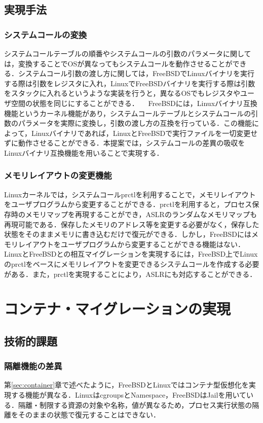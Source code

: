 \documentclass[11pt]{jarticle}
\begin{document}
\subsection{実現手法}
\subsubsection{システムコールの変換}
システムコールテーブルの順番やシステムコールの引数のパラメータに関しては，変換することでOSが異なってもシステムコールを動作させることができる．システムコール引数の渡し方に関しては，FreeBSDでLinuxバイナリを実行する際は引数をレジスタに入れ，LinuxでFreeBSDバイナリを実行する際は引数をスタックに入れるというような実装を行うと，異なるOSでもレジスタやユーザ空間の状態を同じにすることができる．
　FreeBSDには，Linuxバイナリ互換機能\cite{linux-emu}というカーネル機能があり，システムコールテーブルとシステムコールの引数のパラメータを実際に変換し，引数の渡し方の互換を行っている．この機能によって，Linuxバイナリであれば，LinuxとFreeBSDで実行ファイルを一切変更せずに動作させることができる．本提案では，システムコールの差異の吸収をLinuxバイナリ互換機能を用いることで実現する．

\subsubsection{メモリレイアウトの変更機能}
Linuxカーネルでは，システムコールprctlを利用することで，メモリレイアウトをユーザプログラムから変更することができる．prctlを利用すると，プロセス保存時のメモリマップを再現することができ，ASLRのランダムなメモリマップも再現可能である．保存したメモリのアドレス等を変更する必要がなく，保存した状態をそのままメモリに書き込むだけで復元ができる．しかし，FreeBSDにはメモリレイアウトをユーザプログラムから変更することができる機能はない．LinuxとFreeBSDとの相互マイグレーションを実現するには，FreeBSD上でLinuxのprctlをベースにメモリレイアウトを変更できるシステムコールを作成する必要がある．また，prctlを実現することにより，ASLRにも対応することができる．

\section{コンテナ・マイグレーションの実現}
\label{sec:CM}
\subsection{技術的課題}
\subsubsection{隔離機能の差異}
第\ref{sec:container}章で述べたように，FreeBSDとLinuxではコンテナ型仮想化を実現する機能が異なる．LinuxはcgroupsとNamespace，FreeBSDはJailを用いている．隔離・制限する資源の対象や名称，値が異なるため，プロセス実行状態の隔離をそのままの状態で復元することはできない．
\end{document}
